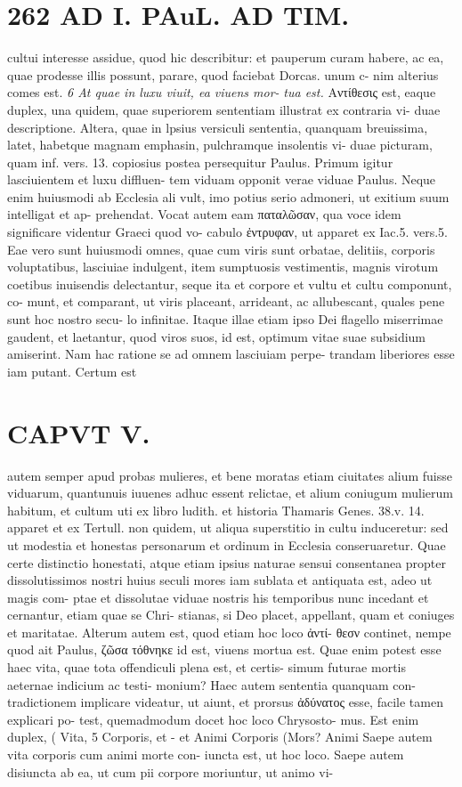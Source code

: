 \documentclass{article}
\begin{document}
\begin{pages}
\section*{262 AD I. PAuL. AD TIM. }cultui interesse assidue, quod hic describitur: et pauperum curam habere, ac ea, quae prodesse illis possunt, parare, quod faciebat Dorcas. unum c- nim alterius comes est. \textit{6 At quae in luxu viuit, ea viuens mor-} \textit{tua est.} Αντίθεσις est, eaque duplex, una quidem, quae superiorem sententiam illustrat ex contraria vi- duae descriptione. Altera, quae in lpsius versiculi sententia, quanquam breuissima, latet, habetque magnam emphasin, pulchramque insolentis vi- duae picturam, quam inf. vers. 13. copiosius postea persequitur Paulus. Primum igitur lasciuientem et luxu diffluen- tem viduam opponit verae viduae Paulus. Neque enim huiusmodi ab Ecclesia ali vult, imo potius serio admoneri, ut exitium suum intelligat et ap- prehendat. Vocat autem eam παταλῶσαν, qua voce idem significare videntur Graeci quod vo- cabulo ἐντρυφαν, ut apparet ex Iac.5. vers.5. Eae vero sunt huiusmodi omnes, quae cum viris sunt orbatae, delitiis, corporis voluptatibus, lasciuiae indulgent, item sumptuosis vestimentis, magnis virotum coetibus inuisendis delectantur, seque ita et corpore et vultu et cultu componunt, co- munt, et comparant, ut viris placeant, arrideant, ac allubescant, quales pene sunt hoc nostro secu- lo infinitae. Itaque illae etiam ipso Dei flagello miserrimae gaudent, et laetantur, quod viros suos, id est, optimum vitae suae subsidium amiserint. Nam hac ratione se ad omnem lasciuiam perpe- trandam liberiores esse iam putant. Certum est 
\section*{CAPVT V. }
\marginpar{[ p.263 ]}autem semper apud probas mulieres, et bene moratas etiam ciuitates alium fuisse viduarum, quantunuis iuuenes adhuc essent relictae, et alium coniugum mulierum habitum, et cultum uti ex libro ludith. et historia Thamaris Genes. 38.v. 14. apparet et ex Tertull. non quidem, ut aliqua superstitio in cultu induceretur: sed ut modestia et honestas personarum et ordinum in Ecclesia conseruaretur. Quae certe distinctio honestati, atque etiam ipsius naturae sensui consentanea propter dissolutissimos nostri huius seculi mores iam sublata et antiquata est, adeo ut magis com- ptae et dissolutae viduae nostris his temporibus nunc incedant et cernantur, etiam quae se Chri- stianas, si Deo placet, appellant, quam et coniuges et maritatae. Alterum autem est, quod etiam hoc loco ἀντί- θεσν continet, nempe quod ait Paulus, ζῶσα τόθνηκε id est, viuens mortua est. Quae enim potest esse haec vita, quae tota offendiculi plena est, et certis- simum futurae mortis aeternae indicium ac testi- monium? Haec autem sententia quanquam con- tradictionem implicare videatur, ut aiunt, et prorsus ἀδύνατος esse, facile tamen explicari po- test, quemadmodum docet hoc loco Chrysosto- mus. Est enim duplex, ( Vita, 5 Corporis, et - et Animi  Corporis (Mors? Animi Saepe autem vita corporis cum animi morte con- iuncta est, ut hoc loco. Saepe autem disiuncta ab ea, ut cum pii corpore moriuntur, ut animo vi- 

\end{pages}
\end{document}
